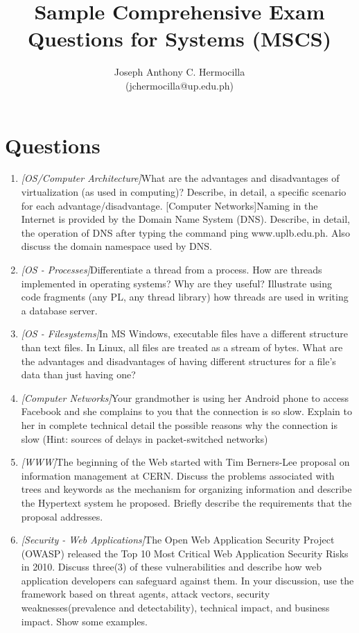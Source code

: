 \documentclass{article}
\title{Sample Comprehensive Exam Questions for Systems (MSCS)}
\author{Joseph Anthony C. Hermocilla \\ (jchermocilla@up.edu.ph)}
\begin{document}
	\maketitle

	\section*{Questions}
	\begin{enumerate}
  	\item {\textit{[OS/Computer Architecture]}What are the advantages and disadvantages of virtualization (as used in computing)? Describe, in detail, a specific scenario for each advantage/disadvantage.
[Computer Networks]Naming in the Internet is provided by the Domain Name System (DNS). Describe, in detail, the operation of DNS after typing the command ping www.uplb.edu.ph. Also discuss the domain namespace used by DNS.}
  	
  	\item {\textit{[OS - Processes]}Differentiate a thread from a process. How are threads implemented in operating systems? Why are they useful? Illustrate using code fragments (any PL, any thread library) how threads are used in writing a database server.}
  	
  	\item {\textit{[OS - Filesystems]}In MS Windows, executable files have a different structure than text files. In Linux, all files are treated as a stream of bytes. What are the advantages and disadvantages of having different structures for a file's data than just having one?}
  	
  	\item{\textit{[Computer Networks]}Your grandmother is using her Android phone to access Facebook and she complains to you that the connection is so slow. Explain to her in complete technical detail the possible reasons why the connection is slow (Hint: sources of delays in packet-switched networks)}
  	
  	\item{\textit{[WWW]}The beginning of the Web started with Tim Berners-Lee proposal on information management at CERN. Discuss the problems associated with trees and keywords as the mechanism for organizing information and describe the Hypertext system he proposed. Briefly describe the requirements that the proposal addresses.}
  	
	\item {\textit{[Security - Web Applications]}The Open Web Application Security Project (OWASP)  released the Top 10 Most Critical Web Application Security Risks in 2010. Discuss three(3) of these vulnerabilities and describe how web application developers can safeguard against them. In your discussion, use the framework based on threat agents,  attack vectors, security weaknesses(prevalence and detectability), technical impact, and business impact. Show some examples.} 	
  	

\end{enumerate}
\end{document}
